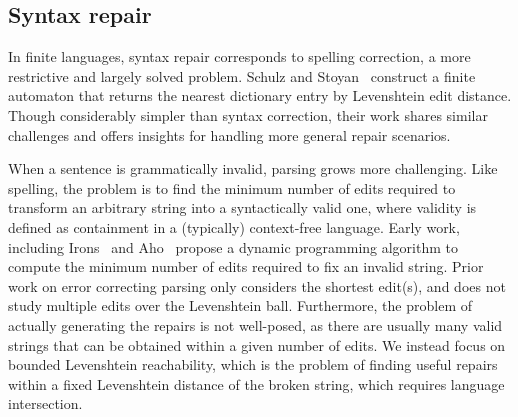 \documentclass[sigplan,review,acmsmall,nonacm,anonymous]{acmart}\settopmatter{printfolios=false,printccs=false,printacmref=false}
\begin{document}
  \subsection{Syntax repair}

  In finite languages, syntax repair corresponds to spelling correction, a more restrictive and largely solved problem. Schulz and Stoyan~\cite{schulz2002fast} construct a finite automaton that returns the nearest dictionary entry by Levenshtein edit distance. Though considerably simpler than syntax correction, their work shares similar challenges and offers insights for handling more general repair scenarios.

  When a sentence is grammatically invalid, parsing grows more challenging. Like spelling, the problem is to find the minimum number of edits required to transform an arbitrary string into a syntactically valid one, where validity is defined as containment in a (typically) context-free language. Early work, including Irons~\cite{irons1963error} and Aho~\cite{aho1972minimum} propose a dynamic programming algorithm to compute the minimum number of edits required to fix an invalid string. Prior work on error correcting parsing only considers the shortest edit(s), and does not study multiple edits over the Levenshtein ball. Furthermore, the problem of actually generating the repairs is not well-posed, as there are usually many valid strings that can be obtained within a given number of edits. We instead focus on bounded Levenshtein reachability, which is the problem of finding useful repairs within a fixed Levenshtein distance of the broken string, which requires language intersection.


\end{document}
